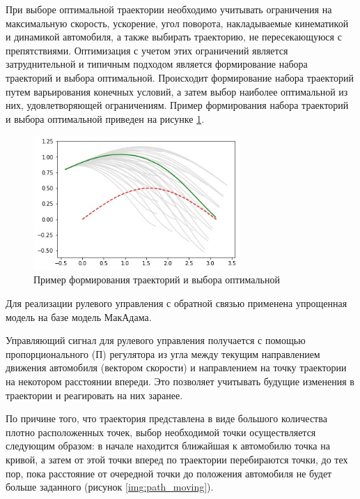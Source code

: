 При выборе оптимальной траектории необходимо учитывать ограничения на максимальную скорость, ускорение,
угол поворота, накладываемые кинематикой и динамикой автомобиля, а также выбирать траекторию, не 
пересекающуюся с препятствиями. Оптимизация с учетом этих ограничений является затруднительной и 
типичным подходом является формирование набора траекторий и выбора оптимальной. Происходит формирование
набора траекторий путем варьирования конечных условий, а затем выбор наиболее оптимальной из них, 
удовлетворяющей ограничениям. Пример формирования набора траекторий и выбора оптимальной приведен на
рисунке \ref{img:trajectory_planning_example}.

\begin{figure}[h]
    \centering
    \includegraphics[width=0.7\textwidth]{images/trajectory_planning_example}
    \caption{Пример формирования траекторий и выбора оптимальной}
    \label{img:trajectory_planning_example}
\end{figure}

Для реализации рулевого управления с обратной связью применена упрощенная модель на базе
модель МакАдама.

Управляющий сигнал для рулевого управления получается с помощью пропорционального (П) регулятора 
из угла между текущим направлением движения автомобиля (вектором скорости) и направлением на 
точку траектории на некотором расстоянии впереди. Это позволяет учитывать будущие изменения 
в траектории и реагировать на них заранее. 

По причине того, что траектория представлена в виде большого количества плотно расположенных
точек, выбор необходимой точки осуществляется следующим образом: в начале находится ближайшая к автомобилю
точка на кривой, а затем от этой точки вперед по траектории перебираются точки, до тех пор, пока
расстояние от очередной точки до положения автомобиля не будет больше заданного (рисунок \ref{img:path_moving}). 

